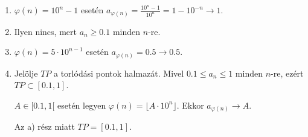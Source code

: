 \documentclass[11pt]{scrartcl}
\begin{document}
\begin{enumerate}
	\item $\varphi(n) = 10^n - 1$ esetén
	      \(
	      a_{\varphi(n)} = \frac{10^n - 1}{10^n} = 1 - 10^{-n} \to 1
	      \).

	\item Ilyen nincs, mert $a_n \ge 0.1$ minden $n$-re.

	\item $\varphi(n) = 5 \cdot 10^{n - 1}$ esetén
	      $a_{\varphi(n)} = 0.5 \to 0.5$.

	\item Jelölje $TP$ a torlódási pontok halmazát. Mivel
	      $0.1 \le a_n \le 1$ minden $n$-re, ezért $TP \subset [0.1, 1]$.

	      $A \in [0.1, 1[$ esetén legyen
	      $\varphi(n) = \lfloor A \cdot 10^n \rfloor$. Ekkor
	      $a_{\varphi(n)} \to A$.

	      Az a) rész miatt $TP = [0.1, 1]$.
\end{enumerate}
\end{document}

